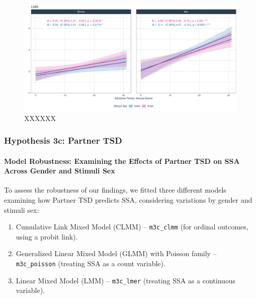 \documentclass[
  bookmarksnumbered]{article}
\providecommand{\tightlist}{%
  \setlength{\itemsep}{0pt}\setlength{\parskip}{0pt}}
\begin{document}
\begin{figure}
\centering
\includegraphics{Sexual_Desire_Arousal_V2_files/figure-latex/fig-h3b-1.pdf}
\caption{\label{fig:fig-h3b}XXXXXX}
\end{figure}

\subsubsection{Hypothesis 3c: Partner TSD}\label{hyp3c}

\paragraph{Model Robustness: Examining the Effects of Partner TSD on SSA Across Gender and Stimuli Sex}\label{model-robustness-examining-the-effects-of-partner-tsd-on-ssa-across-gender-and-stimuli-sex-1}

To assess the robustness of our findings, we fitted three different models examining how Partner TSD predicts SSA, considering variations by gender and stimuli sex:

\begin{enumerate}
\def\labelenumi{\arabic{enumi}.}
\tightlist
\item
  Cumulative Link Mixed Model (CLMM) -- \texttt{m3c\_clmm} (for ordinal outcomes, using a probit link).
\item
  Generalized Linear Mixed Model (GLMM) with Poisson family -- \texttt{m3c\_poisson} (treating SSA as a count variable).
\item
  Linear Mixed Model (LMM) -- \texttt{m3c\_lmer} (treating SSA as a continuous variable).
\end{enumerate}
\end{document}
